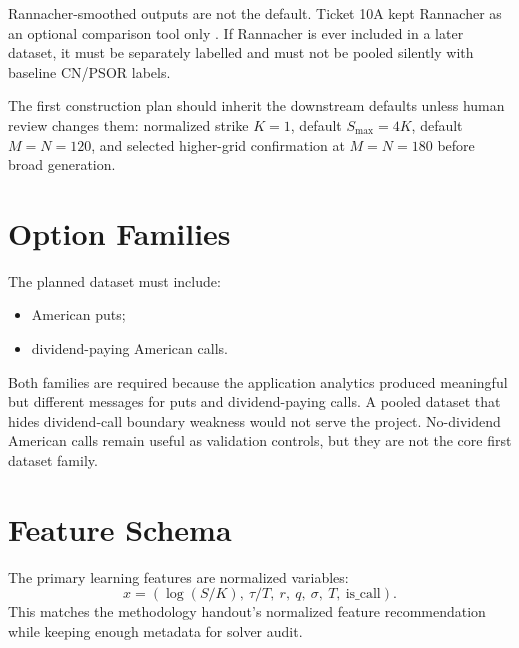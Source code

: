 \documentclass[11pt,a4paper]{article}
\begin{document}
Rannacher-smoothed outputs are not the default. Ticket 10A kept Rannacher as an optional
comparison tool only \citep{rannacher_1984}. If Rannacher is ever included in a later dataset, it
must be separately labelled and must not be pooled silently with baseline CN/PSOR labels.

The first construction plan should inherit the downstream defaults unless human review changes
them: normalized strike \(K=1\), default \(S_{\max}=4K\), default \(M=N=120\), and selected
higher-grid confirmation at \(M=N=180\) before broad generation.

\section{Option Families}

The planned dataset must include:
\begin{itemize}
  \item American puts;
  \item dividend-paying American calls.
\end{itemize}

Both families are required because the application analytics produced meaningful but different
messages for puts and dividend-paying calls. A pooled dataset that hides dividend-call boundary
weakness would not serve the project. No-dividend American calls remain useful as validation
controls, but they are not the core first dataset family.

\section{Feature Schema}

The primary learning features are normalized variables:
\[
x = \left(\log(S/K),\ \tau/T,\ r,\ q,\ \sigma,\ T,\ \text{is\_call}\right).
\]
This matches the methodology handout's normalized feature recommendation while keeping enough
metadata for solver audit.
\end{document}
